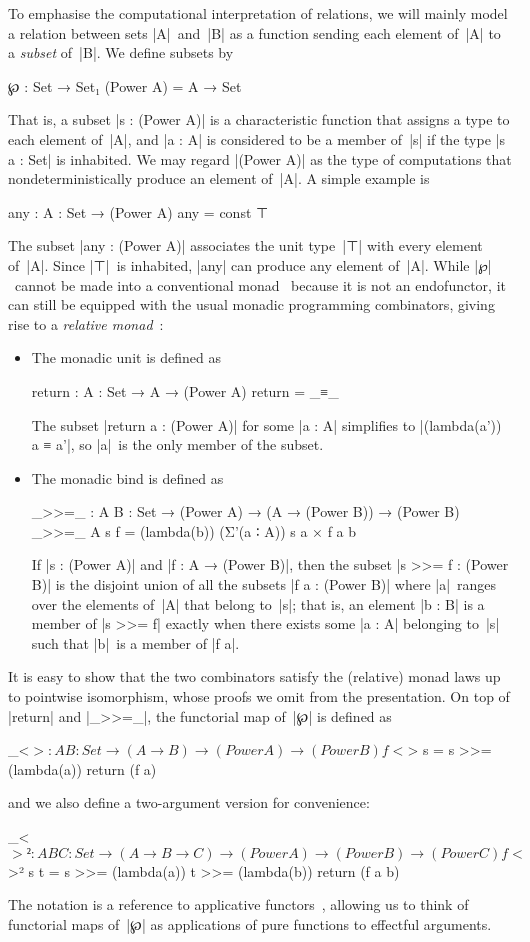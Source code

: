 To emphasise the computational interpretation of relations, we will mainly model a relation between sets |A|~and~|B| as a function sending each element of~|A| to a \emph{subset} of~|B|.
We define subsets by
\begin{code}
℘ : Set → Set₁
(Power A) = A → Set
\end{code}
That is, a subset |s : (Power A)| is a characteristic function that assigns a type to each element of~|A|, and |a : A| is considered to be a member of~|s| if the type |s a : Set| is inhabited.
We may regard |(Power A)| as the type of computations that nondeterministically produce an element of~|A|.
A simple example is
\begin{code}
any : {A : Set} → (Power A)
any = const ⊤
\end{code}
The subset |any : (Power A)| associates the unit type~|⊤| with every element of~|A|.
Since |⊤|~is inhabited, |any| can produce any element of~|A|.
While |℘|~cannot be made into a conventional monad~\citep{Moggi-monads, Wadler-essence} because it is not an endofunctor, it can still be equipped with the usual monadic programming combinators, giving rise to a \emph{relative monad}~\citep{Altenkirch-relative-monads}:
\begin{itemize}
\item The monadic unit is defined as
\begin{code}
return : {A : Set} → A → (Power A)
return = _≡_
\end{code}
The subset |return a : (Power A)| for some |a : A| simplifies to |(lambda(a')) a ≡ a'|, so |a|~is the only member of the subset.
\item The monadic bind is defined as
\begin{code}
_>>=_ : {A B : Set} → (Power A) → (A → (Power B)) → (Power B)
_>>=_ {A} s f = (lambda(b)) (Σ'(a ∶ A)) s a × f a b
\end{code}
If |s : (Power A)| and |f : A → (Power B)|, then the subset |s >>= f : (Power B)| is the disjoint union of all the subsets |f a : (Power B)| where |a|~ranges over the elements of~|A| that belong to~|s|; that is, an element |b : B| is a member of |s >>= f| exactly when there exists some |a : A| belonging to~|s| such that |b|~is a member of |f a|.
\end{itemize}
It is easy to show that the two combinators satisfy the (relative) monad laws up to pointwise isomorphism, whose proofs we omit from the presentation.
On top of |return| and |_>>=_|\kern1pt, the functorial map of~|℘| is defined as
\begin{code}
_<$> : {A B : Set} → (A → B) → (Power A) → (Power B)
f <$> s = s >>= (lambda(a)) return (f a)
\end{code}
and we also define a two-argument version for convenience:
\begin{code}
_<$>² : {A B C : Set} → (A → B → C) → (Power A) → (Power B) → (Power C)
f <$>² s t = s >>= (lambda(a)) t >>= (lambda(b)) return (f a b)
\end{code}
The notation is a reference to applicative functors~\citep{McBride-Applicative}, allowing us to think of functorial maps of~|℘| as applications of pure functions to effectful arguments.

